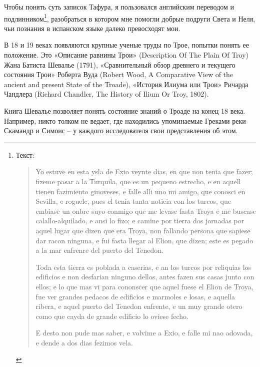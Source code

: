 Чтобы понять суть записок Тафура, я пользовался английским переводом и подлинником\footnote{
Текст\cite[стр. 134]{tafur00}:

\begin{quotation}
Yo estuve en esta ysla de Exio veynte dias, en que non tenia que fazer; fizeme pasar a la Turquila, que es un pequeno estrecho, e en aquell tienen fazimiento ginoveses, e falle alli uno mi amigo, que conosci en Sevilla, e roguele, pues el tenia tanta noticia con los turcos, que embiase un onbre suyo conmigo que me levase fasta Troya e me buscase calallo-alquilado, e ansi lo fizo; e camine por tierra dos jornadas por aquel lugar que dizen que era Troya, non fallando persona que sapiese dar racon ninguna, e fui fasta llegar al Elion, que dizen; este es pegado a la mar enfrenre del puerto del Tenedon.

Toda esta tierra es poblada a caserias, e an los turcos por reliquias los edificios e non desfarian ninguno dellos, antes fazen sus casas junto con ellos; e lo que mas vi para cononscer que aquel fuese el Elion de Troya, fue ver grandes pedacos de edificios e marmoles e losas, e aquella ribera, e aquel puerto del Tenedon enfrente, e un muy grande otero como que cayda de grande edificio lo oviese fecho.

E desto non pude mas saber, e volvime a Exio, e falle mi nao adovada, e dende a dos dias fezimos vela.
\end{quotation}}, разобраться в котором мне помогли добрые подруги Света и Неля, чьи познания в испанском языке далеко превосходят мои.


В 18 и 19 веках появляются крупные ученые труды по Трое, попытки понять ее положение. Это «Описание равнины Трои» (Description Of The Plain Of Troy) Жана Батиста Шевалье (1791), «Сравнительный обзор древнего и текущего состояния Трои» Роберта Вуда (Robert Wood, A Comparative View of the ancient and present State of the Troade), «История Илиума или Трои» Ричарда Чандлера (Richard Chandler, The History of Ilium Or Troy, 1802).

Книга Шевалье позволяет понять состояние знаний о Троаде на конец 18 века. Например, никто толком не ведает, где находились упоминаемые Греками реки Скамандр и Симоис – у каждого исследователя свои представления об этом.

